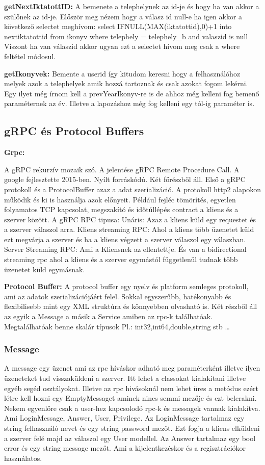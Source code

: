 \documentclass[conference]{IEEEtran}
\begin{document}
 \textbf{getNextIktatottID:}
 A bemenete a telephelynek az id-je és hogy ha van akkor a szülőnek az id-je. Először meg nézem hogy a válasz id null-e ha igen akkor a következő selectet meghívom:  select IFNULL(MAX(iktatottid),0)+1 into nextiktatottid from ikonyv where telephely = telephely\_b and valaszid is null\;
 Viszont ha van válaszid akkor ugyan ezt a selectet hívom meg csak a where feltétel módosul.
 
 \textbf{getIkonyvek:}
 Bemente a userid így kitudom keresni hogy a felhasználóhoz melyek azok a telephelyek amik hozzá tartoznak és csak azokat fogom lekérni. Egy ilyet még írnom kell a prevYearIkonyv-re is de ahhoz még kelleni fog bemenő paraméternek az év. Illetve a lapozáshoz még fog kelleni egy tól-ig paraméter is.


\subsection{\textbf{gRPC és Protocol Buffers}}
\textbf{Grpc:}

A gRPC rekurzív mozaik szó. A jelentése gRPC Remote Procedure Call. A google fejlesztette 2015-ben. Nyílt forráskódú. Két főrészből áll. Első a gRPC protokoll és a ProtocolBuffer azaz a adat szerializáció. A protokoll http2 alapokon működik és ki is használja azok előnyeit. Például fejléc tömörítés, egyetlen folyamatos TCP kapcsolat, megszakító és időtúllépés contract a kliens és a szerver között.\cite{b1} A gRPC RPC tipusa: Unáris: Azaz a kliens küld egy requestet és a szerver válaszol arra. Kliens streaming RPC: Ahol a kliens több üzenetet küld ezt megvárja a szerver és ha a kliens végzett a szerver válaszol egy válaszban. Server Streaming RPC: Ami a Kliensnek az ellentettje. És van a bidirectional streaming rpc ahol a kliens és a szerver egymástól függetlenül tudnak több üzenetet küld egymásnak. \cite{b3}

\textbf{Protocol Buffer:}
A protocol buffer egy nyelv és platform semleges protokoll, ami az adatok szerializációjáért felel. Sokkal egyszerűbb, hatékonyabb és flexibilisebb mint egy XML struktúra és könnyebben olvasható is.\cite{b2} Két részből áll az egyik a Message a másik a Service amiben az rpc-k találhatóak. Megtalálhatóak benne skalár típusok Pl.: int32,int64,double,string stb \dots 

\subsubsection{Message}
A message egy üzenet ami az rpc híváskor adható meg paraméterként illetve ilyen üzeneteket tud visszaküldeni a szerver. Itt lehet a classokat kialakítani illetve egyéb segéd osztályokat. Illetve az rpc hivásoknál nem lehet üres a metódus ezért létre kell hozni egy EmptyMessaget aminek nincs semmi mezője és ezt belerakni. Nekem egyenlőre csak a user-hez kapcsolodó rpc-k és messagek vannak kialakítva. Ami LoginMessage, Answer, User, Privilege. Az LoginMessage tartalmaz egy string felhasználó nevet és egy string password mezőt. Ezt fogja a kliens elküldeni a szerver felé majd az válaszol egy User modellel. Az Answer tartalmaz egy bool error és egy string message mezőt. Ami a kijelentkezéskor és a regisztrációkor használatos. 
\end{document}
